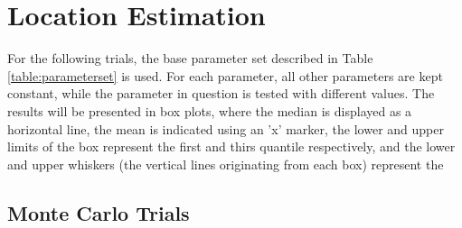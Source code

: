 \section{Location Estimation}
For the following trials, the base parameter set described in Table \ref{table:parameterset} is used. For each parameter, all other parameters are kept constant, while the parameter in question is tested with different values. The results will be presented in box plots, where the median is displayed as a horizontal line, the mean is indicated using an 'x' marker, the lower and upper limits of the box represent the first and thirs quantile respectively, and the lower and upper whiskers (the vertical lines originating from each box) represent the 


\subsection{Monte Carlo Trials}


% 	

\setcounter{topnumber}{2}
\setcounter{bottomnumber}{2}
\setcounter{totalnumber}{4}
\renewcommand{\topfraction}{0.85}
\renewcommand{\bottomfraction}{0.85}
\renewcommand{\textfraction}{0.15}
\renewcommand{\floatpagefraction}{0.8}
\renewcommand{\textfraction}{0.1}
\setlength{\floatsep}{5pt plus 2pt minus 2pt}
\setlength{\textfloatsep}{5pt plus 2pt minus 2pt}
\setlength{\intextsep}{5pt plus 2pt minus 2pt}














